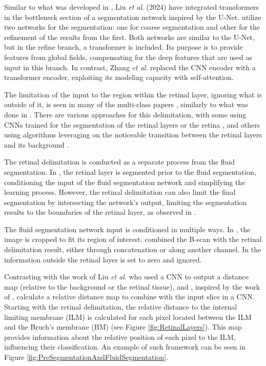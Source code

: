 \par
Similar to what was developed in \cite{Quek2022}, Liu \textit{et al}. (2024) \cite{Liu2024} have integrated transformers in the bottleneck section of a segmentation network inspired by the U-Net. \cite{Liu2024} utilize two networks for the segmentation: one for coarse segmentation and other for the refinement of the results from the first. Both networks are similar to the U-Net, but in the refine branch, a transformer is included. Its purpose is to provide features from global fields, compensating for the deep features that are used as input in this branch. In contrast, Zhang \textit{et al}. \cite{Zhang2023} replaced the CNN encoder with a transformer encoder, exploiting its modeling capacity with self-attention.
\par
The limitation of the input to the region within the retinal layer, ignoring what is outside of it, is seen in many of the multi-class papers \cite{Hassan2021b, Hassan2021a, Lu2019, Mantel2021, Rahil2023, Tang2022, Xing2022}, similarly to what was done in \cite{Pawan2021}. There are various approaches for this delimitation, with some using CNNs trained for the segmentation of the retinal layers or the retina \cite{Mantel2021, Tang2022}, and others using algorithms leveraging on the noticeable transition between the retinal layers and its background \cite{Hassan2021b, Hassan2021a, Lu2019, Rahil2023, Xing2022, Pawan2021}. 
\par
The retinal delimitation is conducted as a separate process from the fluid segmentation. In \cite{Tang2022, Hassan2021b, Hassan2021a, Lu2019, Rahil2023, Xing2022}, the retinal layer is segmented prior to the fluid segmentation, conditioning the input of the fluid segmentation network and simplifying the learning process. However, the retinal delimitation can also limit the final segmentation by intersecting the network's output, limiting the segmentation results to the boundaries of the retinal layer, as observed in \cite{Mantel2021}.
\par
The fluid segmentation network input is conditioned in multiple ways. In \cite{Xing2022}, the image is cropped to fit its region of interest. \cite{Rahil2023, Tang2022, Lu2019} combined the B-scan with the retinal delimitation result, either through concatenation or along another channel. In \cite{Hassan2021b, Hassan2021a, Pawan2021} the information outside the retinal layer is set to zero and ignored. 
\par
Contrasting with the work of Liu \textit{et al}. \cite{Liu2021} who used a CNN to output a distance map (relative to the background or the retinal tissue), \cite{Tang2022} and \cite{Rahil2023}, inspired by the work of \cite{Lu2019}, calculate a relative distance map to combine with the input slice in a CNN. Starting with the retinal delimitation, the relative distance to the internal limiting membrane (ILM) is calculated for each pixel located between the ILM and the Bruch's membrane (BM) (see Figure \ref{fig:RetinalLayers}). This map provides information about the relative position of each pixel to the ILM, influencing their classification. An example of such framework can be seen in Figure \ref{fig:PreSegmentationAndFluidSegmentation}.
